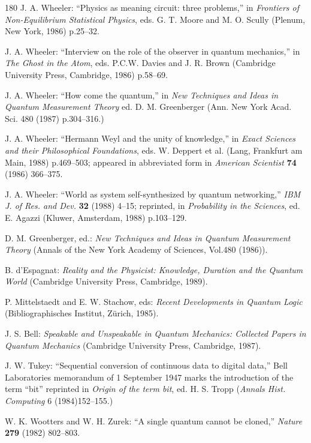 \documentclass[11pt]{article}
\begin{document}
\begin{thebibliography}{180}
		J. A. Wheeler: ``Physics as meaning circuit: three problems,'' in \emph{Frontiers of Non-Equilibrium Statistical Physics}, eds. G. T. Moore and M. O. Scully (Plenum, New York, 1986) p.25--32.
		
		J. A. Wheeler: ``Interview on the role of the observer in quantum mechanics,'' in \emph{The Ghost in the Atom}, eds. P.C.W. Davies and J. R. Brown (Cambridge University Press, Cambridge, 1986) p.58--69.
		
		J. A. Wheeler: ``How come the quantum,'' in \emph{New Techniques and Ideas in Quantum Measurement Theory} ed. D. M. Greenberger (Ann. New York Acad. Sci. 480 (1987) p.304--316.)
		
		J. A. Wheeler: ``Hermann Weyl and the unity of knowledge,'' in \emph{Exact Sciences and their Philosophical Foundations}, eds. W. Deppert et al. (Lang, Frankfurt am Main, 1988) p.469--503; appeared in abbreviated form in \emph{American Scientist} \textbf{74} (1986) 366--375.
		
		J. A. Wheeler: ``World as system self-synthesized by quantum networking,'' \emph{IBM J. of Res. and Dev.} \textbf{32} (1988) 4--15; reprinted, in \emph{Probability in the Sciences}, ed. E. Agazzi (Kluwer, Amsterdam, 1988) p.103--129.
		
		D. M. Greenberger, ed.: \emph{New Techniques and Ideas in Quantum Measurement Theory} (Annals of the New York Academy of Sciences, Vol.480 (1986)).
		
		B. d'Espagnat: \emph{Reality and the Physicist: Knowledge, Duration and the Quantum World} (Cambridge University Press, Cambridge, 1989).
		
		P. Mittelstaedt and E. W. Stachow, eds: \emph{Recent Developments in Quantum Logic} (Bibliographisches Institut, Zürich, 1985).
		
		J. S. Bell: \emph{Speakable and Unspeakable in Quantum Mechanics: Collected Papers in Quantum Mechanics} (Cambridge University Press, Cambridge, 1987).
		
		J. W. Tukey: ``Sequential conversion of continuous data to digital data,'' Bell Laboratories memorandum of 1 September 1947 marks the introduction of the term ``bit'' reprinted in \emph{Origin of the term bit}, ed. H. S. Tropp (\emph{Annals Hist. Computing} 6 (1984)152--155.)
		
		W. K. Wootters and W. H. Zurek: ``A single quantum cannot be cloned,'' \emph{Nature} \textbf{279} (1982) 802--803.
		

\end{thebibliography}
\end{document}
